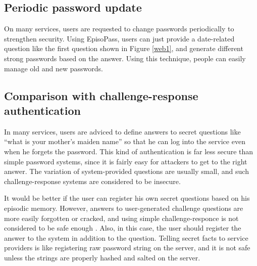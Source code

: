 \documentclass{sigchi}
\begin{document}
\subsection{Periodic password update}

On many services, users are requested to change passwords periodically
to strengthen security.
%
%
Using EpisoPass, users can just provide a date-related question
like the first question shown in Figure \ref{web1},
and generate different strong passwords based on the answer.
Using this technique, people can easily manage old and new passwords.

\subsection{Comparison with challenge-response authentication}


In many services, users are adviced to define answers to secret questions like
``what is your mother's maiden name''
so that he can log into the service even when he forgets the password.
This kind of authentication is far less secure than simple password systems,
since it is fairly easy for attackers to get to the right answer.
The variation of system-provided questions are usually small, and
such challenge-response systems are considered to be
insecure\cite{Rabkin:2008:PKQ:1408664.1408667}.

It would be better if the user can register his own secret questions
based on his episodic memory.
However, answers to user-generated challenge questions are more easily
forgotten or cracked,
and using simple challenge-responce is not considered to be safe enough
\cite{Just:2009:PCC:1572532.1572543}\cite{Schechter:2009:NSM:1607723.1608145}.
%
Also, in this case,
the user should register the answer to the system in addition to the question.
Telling secret facts to service providers is like
registering raw password string on the server,
and it is not safe unless the strings are properly hashed and salted on the server.
\end{document}
